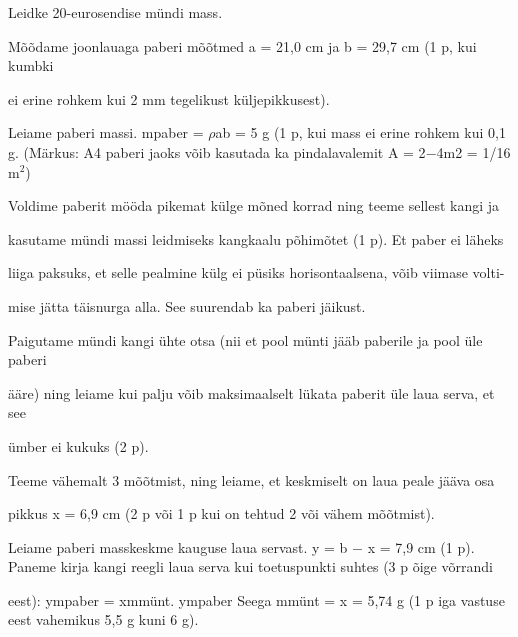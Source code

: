 
Leidke 20-eurosendise mündi mass.

\hint

\solu
Mõõdame joonlauaga paberi mõõtmed a = 21,0 cm ja b = 29,7 cm (1 p, kui kumbki

ei erine rohkem kui 2 mm tegelikust küljepikkusest).

Leiame paberi massi. mpaber = $\rho$ab = 5 g (1 p, kui mass ei erine rohkem kui 0,1 g. (Märkus: A4 paberi jaoks võib kasutada ka pindalavalemit A = 2$-$4m2 = 1/16 m$^2$)

Voldime paberit mööda pikemat külge mõned korrad ning teeme sellest kangi ja

kasutame mündi massi leidmiseks kangkaalu põhimõtet (1 p). Et paber ei läheks

liiga paksuks, et selle pealmine külg ei püsiks horisontaalsena, võib viimase volti-

mise jätta täisnurga alla. See suurendab ka paberi jäikust.

Paigutame mündi kangi ühte otsa (nii et pool münti jääb paberile ja pool üle paberi

ääre) ning leiame kui palju võib maksimaalselt lükata paberit üle laua serva, et see

ümber ei kukuks (2 p).

Teeme vähemalt 3 mõõtmist, ning leiame, et keskmiselt on laua peale jääva osa

pikkus x = 6,9 cm (2 p või 1 p kui on tehtud 2 või vähem mõõtmist).

Leiame paberi masskeskme kauguse laua servast. y = b $-$ x = 7,9 cm (1 p). Paneme kirja kangi reegli laua serva kui toetuspunkti suhtes (3 p õige võrrandi

eest): ympaber = xmmünt. ympaber Seega mmünt = x = 5,74 g (1 p iga vastuse eest vahemikus 5,5 g kuni 6 g).
\probend

